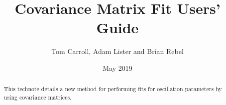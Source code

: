 \documentclass[12pt]{article}
\title{Covariance Matrix Fit Users' Guide}
\author{Tom Carroll, Adam Lister and Brian Rebel}
\date{May 2019}
\begin{document}
\maketitle

\begin{abstract}
    This technote details a new method for performing fits for oscillation parameters by using covariance matrices.
\end{abstract}

\tableofcontents







\end{document}
